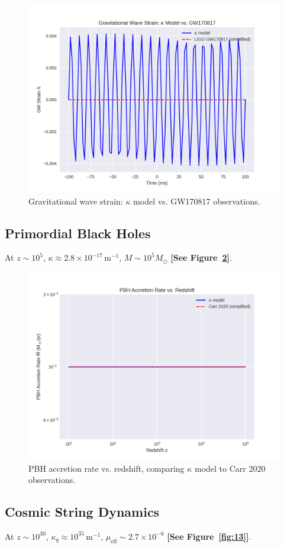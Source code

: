 \documentclass[a4paper,12pt]{article}
\begin{document}
\begin{figure}[H]
    \centering
    \includegraphics[width=0.8\linewidth]{figure11.png}
    \caption{Gravitational wave strain: $\kappa$ model vs. GW170817 observations.}
    \label{fig:11}
\end{figure}

\subsection{Primordial Black Holes}
At $z \sim 10^5$, $\kappa \approx 2.8 \times 10^{-17} \, \text{m}^{-1}$, $M \sim 10^5 M_\odot$ \citep{Carr2020} \textbf{[See Figure~\ref{fig:12}]}.

\begin{figure}[H]
    \centering
    \includegraphics[width=0.8\linewidth]{figure12.png}
    \caption{PBH accretion rate vs. redshift, comparing $\kappa$ model to Carr 2020 observations.}
    \label{fig:12}
\end{figure}

\subsection{Cosmic String Dynamics}
At $z \sim 10^{30}$, $\kappa_q \approx 10^{35} \, \text{m}^{-1}$, $\mu_\text{eff} \sim 2.7 \times 10^{-6}$ \citep{Carr2020} \textbf{[See Figure~\ref{fig:13}]}.
\end{document}
